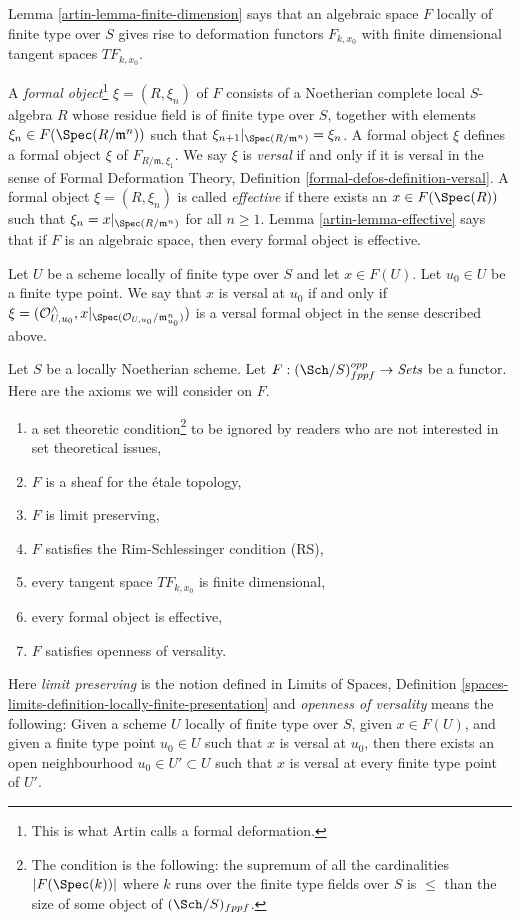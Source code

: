 \medskip\noindent
Lemma \ref{artin-lemma-finite-dimension} says that an algebraic space $F$
locally of finite type over $S$ gives rise to deformation functors
$F_{k, x_0}$ with finite dimensional tangent spaces $TF_{k, x_0}$.

\medskip\noindent
A {\it formal object}\footnote{This is what Artin calls a formal deformation.}
$\xi = (R, \xi_n)$ of $F$ consists of a Noetherian
complete local $S$-algebra $R$ whose residue field is of finite type
over $S$, together with elements $\xi_n \in F(\Spec(R/\mathfrak m^n))$
such that $\xi_{n + 1}|_{\Spec(R/\mathfrak m^n)} = \xi_n$. A formal
object $\xi$ defines a formal object $\xi$ of $F_{R/\mathfrak m, \xi_1}$.
We say $\xi$ is {\it versal} if and only if it is versal in the sense of
Formal Deformation Theory, Definition \ref{formal-defos-definition-versal}.
A formal object $\xi = (R, \xi_n)$ is called {\it effective}
if there exists an $x \in F(\Spec(R))$ such that
$\xi_n = x|_{\Spec(R/\mathfrak m^n)}$ for all $n \geq 1$.
Lemma \ref{artin-lemma-effective} says that if $F$ is an algebraic space,
then every formal object is effective.

\medskip\noindent
Let $U$ be a scheme locally of finite type over $S$ and let $x \in F(U)$.
Let $u_0 \in U$ be a finite type point. We say that $x$ is versal at $u_0$
if and only if
$\xi = (\mathcal{O}_{U, u_0}^\wedge,
x|_{\Spec(\mathcal{O}_{U, u_0}/\mathfrak m_{u_0}^n)})$
is a versal formal object in the sense described above.

\medskip\noindent
Let $S$ be a locally Noetherian scheme. Let
$F : (\Sch/S)_{fppf}^{opp} \to \textit{Sets}$ be a functor.
Here are the axioms we will consider on $F$.
\begin{enumerate}
\item[{[-1]}]  a set theoretic condition\footnote{The condition is the
following: the supremum of all the cardinalities
$|F(\Spec(k))|$ where $k$ runs over the finite
type fields over $S$ is $\leq$ than the size of some
object of $(\Sch/S)_{fppf}$.} to be ignored by
readers who are not interested in set theoretical issues,
\item[{[0]}] $F$ is a sheaf for the \'etale topology,
\item[{[1]}] $F$ is limit preserving,
\item[{[2]}] $F$ satisfies the Rim-Schlessinger condition (RS),
\item[{[3]}] every tangent space $TF_{k, x_0}$ is finite dimensional,
\item[{[4]}] every formal object is effective,
\item[{[5]}] $F$ satisfies openness of versality.
\end{enumerate}
Here {\it limit preserving} is the notion defined in
Limits of Spaces, Definition
\ref{spaces-limits-definition-locally-finite-presentation} and
{\it openness of versality} means the following: Given a scheme $U$
locally of finite type over $S$, given $x \in F(U)$, and given
a finite type point $u_0 \in U$ such that $x$ is versal at $u_0$,
then there exists an open neighbourhood $u_0 \in U' \subset U$
such that $x$ is versal at every finite type point of $U'$.


